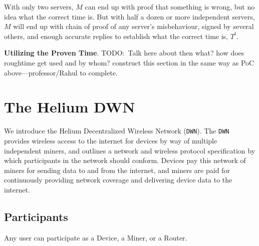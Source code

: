 \documentclass[letterpaper,11pt]{article}
\newcommand{\todo}[1]{}
\renewcommand{\todo}[1]{{\color{red} TODO:\ {#1}}}
\begin{document}
With only two servers, $M$ can end up with proof that something is wrong, but no idea what the correct time is. But with half a dozen or more independent servers, $M$ will end up with chain of proof of any server's misbehaviour, signed by several others, and enough accurate replies to establish what the correct time is, $T^t$.

\textbf{Utilizing the Proven Time}. \todo{Talk here about then what? how does roughtime get used and by whom? construct this section in the same way as PoC above---professor/Rahul to complete.}

\newpage

\section{The Helium DWN}

We introduce the Helium Decentralized Wireless Network (\verb|DWN|). The \verb|DWN| provides wireless access to the internet for devices by way of multiple independent miners, and outlines a network and wireless protocol specification by which participants in the network should conform. Devices pay this network of miners for sending data to and from the internet, and miners are paid for continuously providing network coverage and delivering device data to the internet.

\subsection{Participants}

Any user can participate as a Device, a Miner, or a Router.
\end{document}
